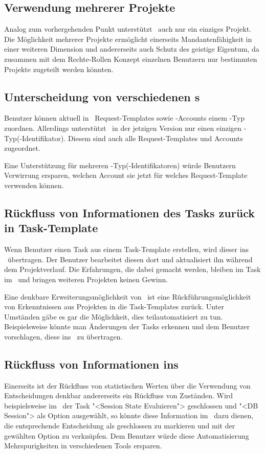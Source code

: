 		
		\subsection{Verwendung mehrerer Projekte}
			Analog zum vorhergehenden Punkt unterstützt \eeppi\ auch nur ein einziges Projekt.
			Die Möglichkeit mehrerer Projekte ermöglicht einerseits Mandantenfähigkeit in einer weiteren Dimension und andererseits auch Schutz des geistige Eigentum, 
			da zusammen mit dem Rechte-Rollen Konzept einzelnen Benutzern nur bestimmten Projekte zugeteilt werden könnten.


		\subsection{Unterscheidung von verschiedenen \ppt s}
			Benutzer können aktuell in \eeppi\ Request-Templates sowie \ppt-Accounts einem \ppt-Typ zuordnen.
			Allerdings unterstützt \eeppi\ in der jetzigen Version nur einen einzigen \ppt-Typ(-Identifikator).
			Diesem sind auch alle Request-Templates und Accounts zugeordnet.
			
			Eine Unterstützung für mehreren \ppt-Typ(-Identifikatoren) würde Benutzern Verwirrung ersparen,
			welchen Account sie jetzt für welches Request-Template verwenden können.
			
			
		\subsection{Rückfluss von Informationen des Tasks zurück in Task-Template}
		\label{subsec:informationFlowbackFeature}
			Wenn Benutzer einen Task aus einem Task-Template erstellen, wird dieser ins \ppt\ übertragen.
			Der Benutzer bearbeitet diesen dort und aktualisiert ihn während dem Projektverlauf.
			Die Erfahrungen, die dabei gemacht werden, bleiben im Task im \ppt\
			und bringen weiteren Projekten keinen Gewinn.
			
			Eine denkbare Erweiterungsmöglichkeit von \eeppi\ ist eine Rückführungsmöglichkeit von
			Erkenntnissen aus Projekten in die Task-Templates zurück.
			Unter Umständen gäbe es gar die Möglichkeit, dies teilautomatisiert zu tun.
			Beispielsweise könnte man Änderungen der Tasks erkennen und dem Benutzer vorschlagen, diese ins \eeppi\ zu übertragen.
			
			
		\subsection{Rückfluss von Informationen ins \dks}
		\label{subsec:informationFlowbackFeatureDKS}
			Einerseits ist der Rückfluss von statistischen Werten über die Verwendung von Entscheidungen denkbar 
			andererseits ein Rückfluss von Zuständen.
			Wird beispielsweise im \ppt\ der Task "<Session State Evaluieren"> geschlossen und "<DB Session"> als Option ausgewählt, 
			so könnte diese Information im \dks\ dazu dienen, 
			die entsprechende Entscheidung als geschlossen zu markieren und mit der gewählten Option zu verknüpfen.
			Dem Benutzer würde diese Automatisierung Mehrspurigkeiten in verschiedenen Tools ersparen.


